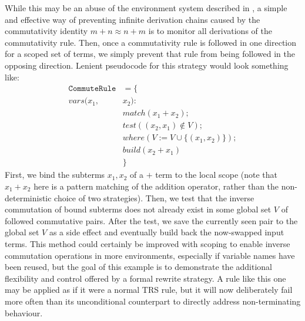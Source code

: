 \documentclass{article}
\begin{document}
While this may be an abuse of the environment system described in \cite{elco1998building},
a simple and effective way of preventing infinite derivation chains caused by the commutativity identity $m + n \approx n + m$ is to
monitor all derivations of the commutativity rule. Then, once a commutativity rule is followed in one direction for a scoped set of terms,
we simply prevent that rule from being followed in the opposing direction. Lenient pseudocode for this strategy would look something like:
\begin{align*}
    \texttt{CommuteRule} &= \{\\
        vars(x_1, &x_2) : \\
        &match(x_1 + x_2); \\
        &test((x_2, x_1) \notin V); \\
        &where(V := V \cup \{(x_1, x_2)\}); \\
        &build(x_2 + x_1)\\
        &\}
\end{align*}
First, we bind the subterms $x_1,x_2$ of a $+$ term to the local scope
(note that $x_1+x_2$ here is a pattern matching of the addition operator, rather than the non-deterministic choice of two strategies).
Then, we test that the inverse commutation of bound subterms does not already exist in some global set $V$ of followed commutative pairs.
After the test, we save the currently seen pair to the global set $V$ as a side effect and eventually build back the now-swapped input terms.
This method could certainly be improved with scoping to enable inverse commutation operations in more environments, especially if variable names have
been reused, but the goal of this example is to demonstrate the additional flexibility and control offered by a formal rewrite strategy.
A rule like this one may be applied as if it were a normal TRS rule, but it will now deliberately fail more often than
its unconditional counterpart to directly address non-terminating behaviour.
\end{document}
